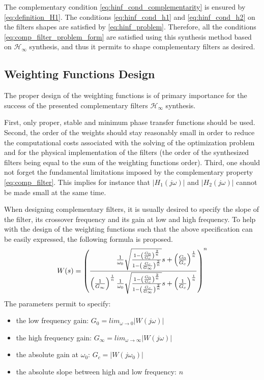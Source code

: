\documentclass[letterpaper, 10 pt, conference]{ieeeconf}
\begin{document}
The complementary condition \eqref{eq:hinf_cond_complementarity} is ensured by \eqref{eq:definition_H1}.
The conditions \eqref{eq:hinf_cond_h1} and \eqref{eq:hinf_cond_h2} on the filters shapes are satisfied by \eqref{eq:hinf_problem}.
Therefore, all the conditions \eqref{eq:comp_filter_problem_form} are satisfied using this synthesis method based on \(\mathcal{H}_\infty\) synthesis, and thus it permits to shape complementary filters as desired.

\subsection{Weighting Functions Design}
\label{sec:orgdf5910c}
\label{sec:hinf_weighting_func}
The proper design of the weighting functions is of primary importance for the success of the presented complementary filters \(\mathcal{H}_\infty\) synthesis.

First, only proper, stable and minimum phase transfer functions should be used.
Second, the order of the weights should stay reasonably small in order to reduce the computational costs associated with the solving of the optimization problem and for the physical implementation of the filters (the order of the synthesized filters being equal to the sum of the weighting functions order).
Third, one should not forget the fundamental limitations imposed by the complementary property \eqref{eq:comp_filter}.
This implies for instance that \(|H_1(j\omega)|\) and \(|H_2(j\omega)|\) cannot be made small at the same time.

When designing complementary filters, it is usually desired to specify the slope of the filter, its crossover frequency and its gain at low and high frequency.
To help with the design of the weighting functions such that the above specification can be easily expressed, the following formula is proposed.
\begin{equation}
\label{eq:weight_formula}
  W(s) = \left( \frac{
           \hfill{} \frac{1}{\omega_0} \sqrt{\frac{1 - \left(\frac{G_0}{G_c}\right)^{\frac{2}{n}}}{1 - \left(\frac{G_c}{G_\infty}\right)^{\frac{2}{n}}}} s + \left(\frac{G_0}{G_c}\right)^{\frac{1}{n}}
         }{
           \left(\frac{1}{G_\infty}\right)^{\frac{1}{n}} \frac{1}{\omega_0} \sqrt{\frac{1 - \left(\frac{G_0}{G_c}\right)^{\frac{2}{n}}}{1 - \left(\frac{G_c}{G_\infty}\right)^{\frac{2}{n}}}} s + \left(\frac{1}{G_c}\right)^{\frac{1}{n}}
         }\right)^n
\end{equation}
The parameters permit to specify:
\begin{itemize}
\item the low frequency gain: \(G_0 = lim_{\omega \to 0} |W(j\omega)|\)
\item the high frequency gain: \(G_\infty = lim_{\omega \to \infty} |W(j\omega)|\)
\item the absolute gain at \(\omega_0\): \(G_c = |W(j\omega_0)|\)
\item the absolute slope between high and low frequency: \(n\)
\end{itemize}
\end{document}
